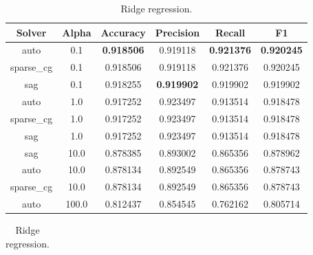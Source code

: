 \begin{appendices}
\begin{table}[ht]
\begin{subtable}{\textwidth}
\begin{adjustbox}{minipage=15cm, center}
\begin{tabular*}{\textwidth}{c @{\extracolsep{\fill}} ccccc}
\toprule
Solver      &  Alpha &  Accuracy &  Precision &    Recall &        F1 \\
\midrule
auto        &    0.1 &  \textbf{0.918506 }&   0.919118 &  \textbf{0.921376} &  \textbf{0.920245} \\
sparse\_cg  &    0.1 &  0.918506 &   0.919118 &  0.921376 &  0.920245 \\
sag         &    0.1 &  0.918255 &   \textbf{0.919902} &  0.919902 &  0.919902 \\
auto        &    1.0 &  0.917252 &   0.923497 &  0.913514 &  0.918478 \\
sparse\_cg  &    1.0 &  0.917252 &   0.923497 &  0.913514 &  0.918478 \\
sag         &    1.0 &  0.917252 &   0.923497 &  0.913514 &  0.918478 \\
sag         &   10.0 &  0.878385 &   0.893002 &  0.865356 &  0.878962 \\
auto        &   10.0 &  0.878134 &   0.892549 &  0.865356 &  0.878743 \\
sparse\_cg  &   10.0 &  0.878134 &   0.892549 &  0.865356 &  0.878743 \\
auto        &  100.0 &  0.812437 &   0.854545 &  0.762162 &  0.805714 \\
\bottomrule

\end{tabular*}
\caption{Ridge regression.}
\label{tab:Ridge regression}
\end{adjustbox}
\end{subtable}


\bigskip
\begin{subtable}{\textwidth}
\begin{adjustbox}{minipage=15cm, center}
\centering
\begin{tabular*}{\textwidth}{c @{\extracolsep{\fill}} cccccc}


\end{tabular*}
\end{adjustbox}
\end{subtable}
\end{table}
\end{appendices}

